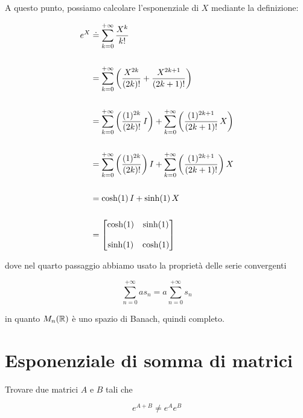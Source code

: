 A questo punto, possiamo calcolare l'esponenziale di $ X $ mediante la definizione:

\begin{align}
	\begin{split}
		e^{X} &\doteq \sum_{k=0}^{+\infty} \dfrac{X^{k}}{k!} \\\\
		&= \sum_{k=0}^{+\infty} \left( \dfrac{X^{2k}}{(2k)!} + \dfrac{X^{2k+1}}{(2k+1)!} \right) \\\\
		&= \sum_{k=0}^{+\infty} \left( \dfrac{(1)^{2k}}{(2k)!} \, I \right) + \sum_{k=0}^{+\infty} \left( \dfrac{(1)^{2k+1}}{(2k+1)!} \, X \right) \\\\
		&= \sum_{k=0}^{+\infty} \left( \dfrac{(1)^{2k}}{(2k)!} \right) I + \sum_{k=0}^{+\infty} \left( \dfrac{(1)^{2k+1}}{(2k+1)!} \right) X \\\\
		&= \cosh(1) \, I + \sinh(1) \, X \\\\
		&= \bmqty{ %
					\cosh(1) & \sinh(1) \\\\
					\sinh(1) & \cosh(1) %
					}
	\end{split}
\end{align}

dove nel quarto passaggio abbiamo usato la proprietà delle serie convergenti

\begin{equation}
	\sum_{n=0}^{+\infty} a s_{n} = a \sum_{n=0}^{+\infty} s_{n}
\end{equation}

in quanto $ M_{n}(\mathbb{R}) $ è uno spazio di Banach, quindi completo.

%

\newpage

%

\section{Esponenziale di somma di matrici}\label{es3-4}

\begin{tcolorbox}
	Trovare due matrici $ A $ e $ B $ tali che
	
	\begin{equation}
		e^{A+B} \neq e^{A} e^{B}
	\end{equation}
\end{tcolorbox}

